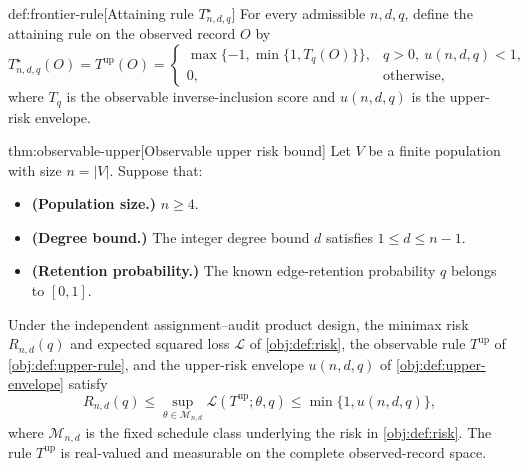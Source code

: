 \documentclass[11pt]{article}
\begin{document}
\begin{definitionv}{def:frontier-rule}[Attaining rule $T^\star_{n,d,q}$]
For every admissible \(n,d,q\), define the attaining rule on the observed record \(O\) by
\[
T^\star_{n,d,q}(O)=T^{\mathrm{up}}(O)=
\begin{cases}
\max\{-1,\min\{1,T_q(O)\}\},&q>0,\ u(n,d,q)<1,\\
0,&\text{otherwise},
\end{cases}
\]
where \(T_q\) is the observable inverse-inclusion score and \(u(n,d,q)\) is the upper-risk envelope.
\end{definitionv}

\begin{theoremv}{thm:observable-upper}[Observable upper risk bound]
Let \(V\) be a finite population with size \(n=|V|\). Suppose that:
\begin{itemize}
\item \textbf{(Population size.)} \(n\ge4\).
\item \textbf{(Degree bound.)} The integer degree bound \(d\) satisfies \(1\le d\le n-1\).
\item \textbf{(Retention probability.)} The known edge-retention probability \(q\) belongs to \([0,1]\).
\end{itemize}
Under the independent assignment--audit product design, the minimax risk \(R_{n,d}(q)\) and expected squared loss \(\mathcal L\) of \cref{obj:def:risk}, the observable rule \(T^{\mathrm{up}}\) of \cref{obj:def:upper-rule}, and the upper-risk envelope \(u(n,d,q)\) of \cref{obj:def:upper-envelope} satisfy
\[
R_{n,d}(q)
\le
\sup_{\theta\in\mathcal M_{n,d}}
\mathcal L(T^{\mathrm{up}};\theta,q)
\le
\min\{1,u(n,d,q)\},
\]
where \(\mathcal M_{n,d}\) is the fixed schedule class underlying the risk in \cref{obj:def:risk}. The rule \(T^{\mathrm{up}}\) is real-valued and measurable on the complete observed-record space.
\end{theoremv}
\end{document}
